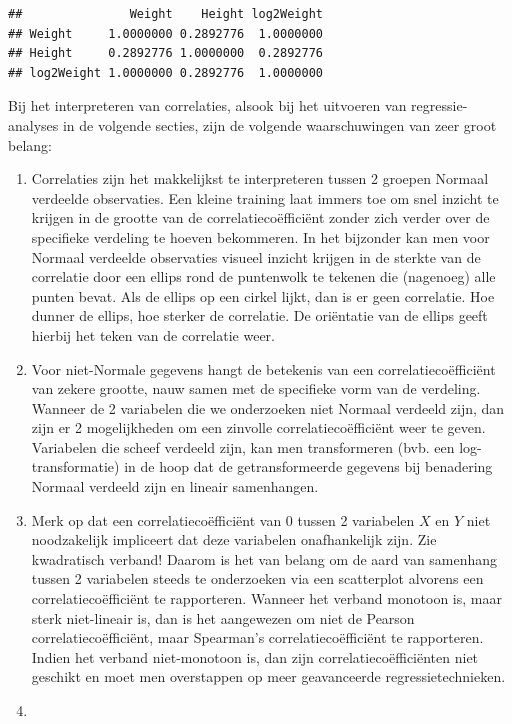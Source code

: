 \documentclass[
  12pt,dutch]{book}
\theoremstyle{definition}
\theoremstyle{definition}
\theoremstyle{definition}
\theoremstyle{definition}
\theoremstyle{remark}
\begin{document}
\begin{verbatim}
##               Weight    Height log2Weight
## Weight     1.0000000 0.2892776  1.0000000
## Height     0.2892776 1.0000000  0.2892776
## log2Weight 1.0000000 0.2892776  1.0000000
\end{verbatim}

Bij het interpreteren van correlaties, alsook bij het uitvoeren van
regressie-analyses in de volgende secties, zijn de volgende waarschuwingen
van zeer groot belang:

\begin{enumerate}
\def\labelenumi{\arabic{enumi}.}
\item
  Correlaties zijn het makkelijkst te interpreteren tussen 2 groepen Normaal verdeelde observaties. Een kleine training laat immers toe om snel inzicht te krijgen in de grootte van de correlatiecoëfficiënt zonder zich verder over de specifieke verdeling te hoeven bekommeren. In het bijzonder kan men voor Normaal verdeelde observaties visueel inzicht krijgen in de sterkte van de correlatie door een ellips rond de puntenwolk te tekenen die (nagenoeg) alle punten bevat. Als de ellips op een cirkel lijkt, dan is er geen correlatie. Hoe dunner de ellips, hoe sterker de correlatie. De oriëntatie van de ellips geeft hierbij het teken van de correlatie weer.
\item
  Voor niet-Normale gegevens hangt de betekenis van een correlatiecoëfficiënt van zekere grootte, nauw samen met de specifieke vorm van de verdeling. Wanneer de 2 variabelen die we onderzoeken niet Normaal verdeeld zijn, dan zijn er 2 mogelijkheden om een zinvolle correlatiecoëfficiënt weer te geven. Variabelen die scheef verdeeld zijn, kan men transformeren (bvb. een log-transformatie) in de hoop dat de getransformeerde gegevens bij benadering Normaal verdeeld zijn en lineair samenhangen.
\item
  Merk op dat een correlatiecoëfficiënt van 0 tussen 2 variabelen \(X\) en \(Y\) niet noodzakelijk impliceert dat deze variabelen onafhankelijk zijn. Zie kwadratisch verband! Daarom is het van belang om de aard van samenhang tussen 2 variabelen steeds te onderzoeken via een scatterplot alvorens een correlatiecoëfficiënt te rapporteren. Wanneer het verband monotoon is, maar sterk niet-lineair is, dan is het aangewezen om niet de Pearson correlatiecoëfficiënt, maar Spearman's correlatiecoëfficiënt te rapporteren. Indien het verband niet-monotoon is, dan zijn correlatiecoëfficiënten niet geschikt en moet men overstappen op meer geavanceerde regressietechnieken.
\item

\end{enumerate}
\end{document}
